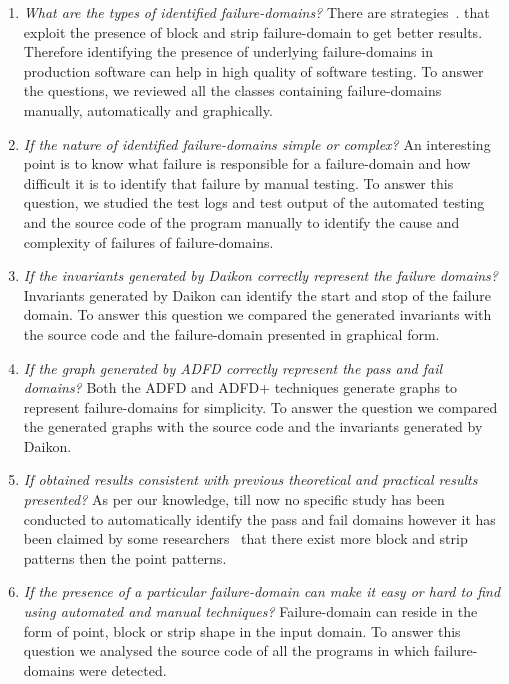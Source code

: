 \documentclass[conference]{IEEEtran}
\begin{document}
\begin{enumerate}
\item \textit{What are the types of identified failure-domains?} There are strategies~\cite{}.  that exploit the presence of block and strip failure-domain to get better results. Therefore identifying the presence of underlying failure-domains in production software can help in high quality of software testing.  To answer the questions, we reviewed all the classes containing failure-domains manually, automatically and graphically.
%
\item \textit{If the nature of identified failure-domains simple or complex?} An interesting point is to know what failure is responsible for a failure-domain and how difficult it is to identify that failure by manual testing. To answer this question, we studied the test logs and test output of the automated testing and the source code of the program manually to identify the cause and complexity of failures of failure-domains. 
%
\item \textit{If the invariants generated by Daikon correctly represent the failure domains?} Invariants generated by Daikon can identify the start and stop of the failure domain. To answer this question we compared the generated invariants with the source code and the failure-domain presented in graphical form.
%
\item \textit{If the graph generated by ADFD correctly represent the pass and fail domains?} Both the ADFD and ADFD+ techniques generate graphs to represent failure-domains for simplicity. To answer the question we compared the generated graphs with the source code and the invariants generated by Daikon.
%
\item \textit{If obtained results consistent with previous theoretical and practical results presented?}  As per our knowledge, till now no specific study has been conducted to automatically identify the pass and fail domains however it has been claimed by some researchers~\cite{} that there exist more block and strip patterns then the point patterns. 
%
\item \textit{If the presence of a particular failure-domain can make it easy or hard to find using automated and manual techniques?} 
Failure-domain can reside in the form of point, block or strip shape in the input domain. To answer this question we analysed the source code of all the programs in which failure-domains were detected.
\end{enumerate}
\end{document}
